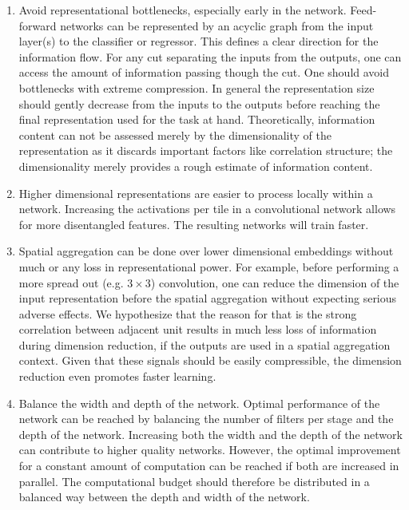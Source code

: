 \documentclass[10pt,twocolumn,letterpaper]{article}
\begin{document}
\begin{enumerate}
  \item Avoid representational bottlenecks, especially early in the network. Feed-forward networks can be represented by an acyclic graph from the input layer(s) to the classifier or regressor. This defines a clear direction for the information flow. For any cut separating the inputs from the outputs, one can access the amount of information passing though the cut. One should avoid bottlenecks with extreme compression. In general the representation size should gently decrease from the inputs to the outputs before reaching the final representation used for the task at hand. Theoretically, information content can not be assessed merely by the dimensionality of the representation as it discards important factors like correlation structure; the dimensionality merely provides a rough estimate of information content. \label{nobottlenecks}
  \item Higher dimensional representations are easier to process locally within a network. Increasing the activations per tile in a convolutional network allows for more disentangled features. The resulting networks will train faster. \label{highdim}
  \item Spatial aggregation can be done over lower dimensional embeddings without much or any loss in representational power. For example, before performing a more spread out (e.g. $3\times 3$) convolution, one can reduce the dimension of the input representation before the spatial aggregation without expecting serious adverse effects. We hypothesize that the reason for that is the strong correlation between adjacent unit results in much less loss of information during dimension reduction, if the outputs are used in a spatial aggregation context. Given that these signals should be easily compressible, the dimension reduction even promotes faster learning. \label{lowdim}
\item Balance the width and depth of the network. Optimal performance of the network can be reached by balancing the number of filters per stage and the depth of the network. Increasing both the width and the depth of the network can contribute to higher quality networks. However, the optimal improvement for a constant amount of computation can be reached if both are increased in parallel. The computational budget should therefore be distributed in a balanced way between the depth and width of the network. \label{balance}
\end{enumerate}
\end{document}
